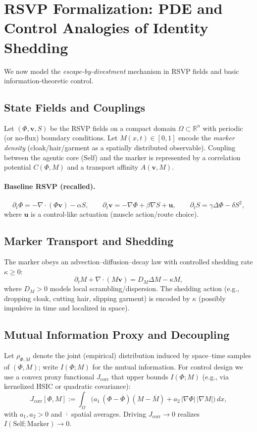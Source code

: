 \documentclass[a4paper,11pt,openany]{book}
\begin{document}
\section{RSVP Formalization: PDE and Control Analogies of Identity Shedding}

We now model the \emph{escape-by-divestment} mechanism in RSVP fields and basic information-theoretic control.

\subsection{State Fields and Couplings}
Let $(\Phi,\mathbf{v},S)$ be the RSVP fields on a compact domain $\Omega\subset\mathbb{R}^n$ with periodic (or no-flux) boundary conditions.
Let $M(x,t)\in[0,1]$ encode the \emph{marker density} (cloak/hair/garment as a spatially distributed observable).
Coupling between the agentic core (Self) and the marker is represented by a correlation potential $C(\Phi,M)$ and a transport affinity $A(\mathbf{v},M)$.

\paragraph{Baseline RSVP (recalled).}
\[
\partial_t \Phi = -\nabla\!\cdot(\Phi \mathbf{v}) - \alpha S,\qquad
\partial_t \mathbf{v} = -\nabla \Phi + \beta \nabla S + \mathbf{u},\qquad
\partial_t S = \gamma \Delta \Phi - \delta S^2,
\]
where $\mathbf{u}$ is a control-like actuation (muscle action/route choice).

\subsection{Marker Transport and Shedding}
The marker obeys an advection–diffusion–decay law with controlled shedding rate $\kappa\ge 0$:
\begin{equation}
\label{eq:marker}
\partial_t M + \nabla\!\cdot(M\mathbf{v}) = D_M \Delta M - \kappa M,
\end{equation}
where $D_M>0$ models local scrambling/dispersion. The shedding action (e.g., dropping cloak, cutting hair, slipping garment) is encoded by $\kappa$ (possibly impulsive in time and localized in space).

\subsection{Mutual Information Proxy and Decoupling}
Let $\rho_{\Phi,M}$ denote the joint (empirical) distribution induced by space–time samples of $(\Phi,M)$; write $I(\Phi;M)$ for the mutual information.
For control design we use a convex proxy functional $J_{\text{corr}}$ that upper bounds $I(\Phi;M)$ (e.g., via kernelized HSIC or quadratic covariance):
\[
J_{\text{corr}}[\Phi,M] := \int_{\Omega} \big( a_1\,(\Phi-\overline{\Phi})(M-\overline{M}) + a_2\,|\nabla \Phi|\,|\nabla M| \big)\,dx,
\]
with $a_1,a_2>0$ and $\overline{\cdot}$ spatial averages. Driving $J_{\text{corr}}\to 0$ realizes $I(\text{Self};\text{Marker})\to 0$.
\end{document}
